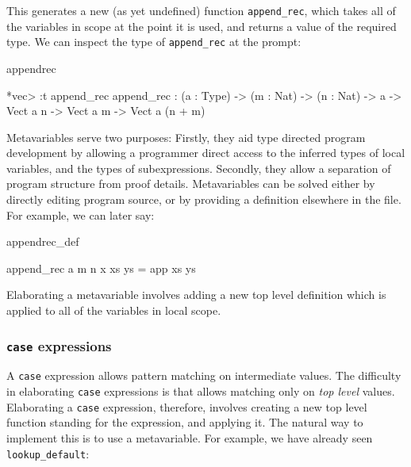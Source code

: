 This generates a new (as yet undefined)
function \texttt{append\_rec}, which takes all of the variables
in scope at the point it is used, and returns a value of the required type.
We can inspect the type of \texttt{append\_rec} at the \Idris{} prompt:

\begin{SaveVerbatim}{appendrec}

*vec> :t append_rec
append_rec : (a : Type) -> (m : Nat) -> (n : Nat) -> a -> 
             Vect a n -> Vect a m -> Vect a (n + m)

\end{SaveVerbatim}

Metavariables serve two purposes: Firstly, they aid type directed program development
by allowing a programmer direct access to the inferred types of local variables, and
the types of subexpressions. Secondly, they allow a separation of program structure
from proof details. Metavariables can be solved either by directly editing program
source, or by providing a definition elsewhere in the file. For example, we can later say:

\begin{SaveVerbatim}{appendrec_def}

append_rec a m n x xs ys = app xs ys

\end{SaveVerbatim}

Elaborating a metavariable involves adding a new top level definition which is applied
to all of the variables in local scope.


\subsubsection{\texttt{case} expressions}

A \texttt{case} expression allows pattern matching on intermediate values. The difficulty
in elaborating \texttt{case} expressions is that \TT{} allows matching only on
\emph{top level} values. Elaborating a \texttt{case} expression, therefore,
involves creating a new top level function standing for the expression, and applying it. 
The natural
way to implement this is to use a metavariable. For example, we have already seen
\texttt{lookup\_default}:

